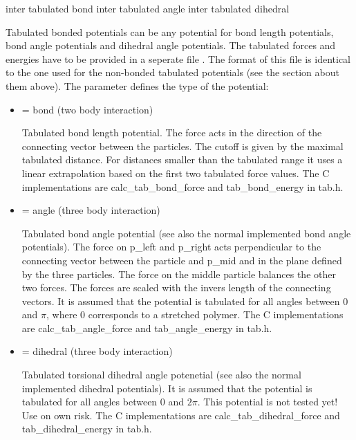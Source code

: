 \begin{essyntax}
     inter  
    tabulated bond 
     inter  
    tabulated angle 
     inter  
    tabulated dihedral 
\end{essyntax}

Tabulated bonded potentials can be any potential for bond length
potentials, bond angle potentials and dihedral angle potentials. The
tabulated forces and energies have to be provided in a seperate file
. The format of this file is identical to the one used
for the non-bonded tabulated potentials (see the section about them
above). The parameter  defines the type of the potential:

\begin{itemize}
  \item {} = bond (two body interaction)

    Tabulated bond length potential. The force acts in the direction
    of the connecting vector between the particles. The cutoff is
    given by the maximal tabulated distance. For distances smaller
    than the tabulated range it uses a linear extrapolation based on
    the first two tabulated force values. The C implementations are
    calc_tab_bond_force and tab_bond_energy in tab.h.

  \item {} = angle (three body interaction)

    Tabulated bond angle potential (see also the normal implemented
    bond angle potentials). The force on p_left and p_right acts
    perpendicular to the connecting vector between the particle and
    p_mid and in the plane defined by the three particles. The force
    on the middle particle balances the other two forces. The forces
    are scaled with the invers length of the connecting vectors. It is
    assumed that the potential is tabulated for all angles between 0
    and $ \pi $, where 0 corresponds to a stretched polymer. The C 
    implementations are calc_tab_angle_force and tab_angle_energy in
    tab.h.

  \item {} = dihedral (three body interaction)

    Tabulated torsional dihedral angle potenetial (see also the normal
    implemented dihedral potentials). It is assumed that the potential
    is tabulated for all angles between 0 and $ 2\pi $. This potential
    is not tested yet! Use on own risk. The C implementations are
    calc_tab_dihedral_force and tab_dihedral_energy in tab.h.

\end{itemize}


